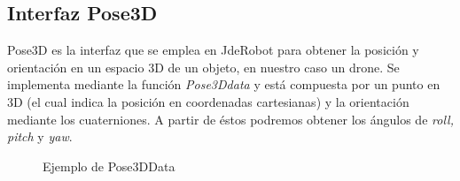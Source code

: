 \subsection{Interfaz Pose3D}
\hspace{1cm} Pose3D es la interfaz que se emplea en JdeRobot para obtener la posición y orientación en un espacio 3D de un objeto, en nuestro caso un drone. Se implementa mediante la función \emph{Pose3Ddata} y está compuesta por un punto en 3D (el cual indica la posición en coordenadas cartesianas) y la orientación mediante los cuaterniones. A partir de éstos podremos obtener los ángulos de \textit{roll, pitch} y \textit{yaw}.

\begin{figure}[H]
 \centering
 \caption{Ejemplo de Pose3DData}
 \label{f:Ejemplo de Pose3DData}
\end{figure} 

